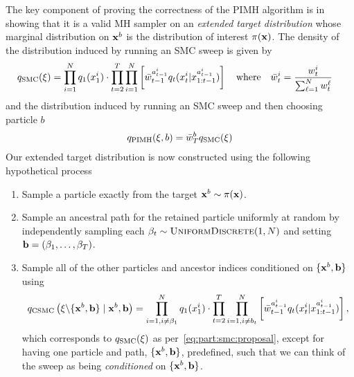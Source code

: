 The key component of proving the correctness of the PIMH algorithm is in showing that it is a valid
MH sampler on an \emph{extended target distribution} whose marginal distribution on $\mathbf{x}^b$ is the distribution of interest $\pi(\mathbf{x})$.
The density of the distribution induced by running an SMC sweep is given by
\begin{align}
\label{eq:part:smc:proposal}
q_{\text{SMC}}(\mathbf{\xi}) &= \prod_{i=1}^N q_1(x_{1}^i) \cdot \prod_{t=2}^T \prod_{i=1}^N \left[ 
\bar w_{t-1}^{a_{t-1}^i}
q_t(x_{t}^i|x_{1:t-1}^{a_{t-1}^i}) \right]  \quad \text{where} \quad \bar{w}_t^i = \frac{{w}_t^i}{\sum_{\ell=1}^{N}w_t^{\ell}}
\end{align}
and the distribution induced by running an SMC sweep and then choosing particle $b$
\begin{align}
q_{\text{PIMH}}(\mathbf{\xi},b) = \bar{w}_T^b q_{\text{SMC}}(\mathbf{\xi})
\end{align}
Our extended target distribution is now constructed using the following hypothetical process
\begin{enumerate}
	\setlength\itemsep{-0.1em}
	\item Sample a particle exactly from the target $\mathbf{x}^b \sim \pi(\mathbf{x})$.
	\item Sample an ancestral path for the retained particle uniformly at random by independently sampling each $\beta_t \sim \textsc{UniformDiscrete}(1,N)$ and setting $\mathbf{b} = (\beta_1,\dots,\beta_T)$.
	\item Sample all of the other particles and ancestor indices conditioned on $\{\mathbf{x}^{b},\mathbf{b}\}$ using
		\begin{align}
	\label{eq:part:csmc}
	q_{\text{CSMC}}\left(\mathbf{\xi} \backslash \{\mathbf{x}^b, \mathbf{b}\} \mid \mathbf{x}^b, \mathbf{b} \right) = 
	\prod_{i=1, i\neq\beta_1}^N  q_1(x_{1}^i) \cdot \prod_{t=2}^T \prod_{i=1,i\neq b_{t}}^N \left[
	\bar w_{t-1}^{a_{t-1}^i}q_t(x_{t}^i|x_{1:t-1}^{a_{t-1}^i})\right],
	\end{align}
	which corresponds to $q_{\text{SMC}}(\mathbf{\xi})$ as per~\eqref{eq:part:smc:proposal},
	except for having one particle and path, $\{\mathbf{x}^{b},\mathbf{b}\}$, predefined, such that we can think
	of the sweep as being \emph{conditioned} on $\{\mathbf{x}^{b},\mathbf{b}\}$.
\end{enumerate}
